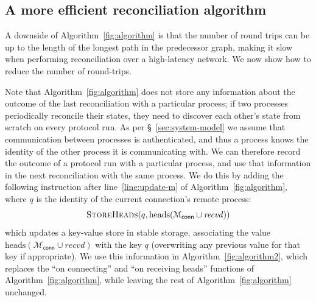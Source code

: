 \documentclass[a4paper,anonymous,USenglish]{lipics-v2019}
\begin{document}
\subsection{A more efficient reconciliation algorithm}\label{sec:algorithm2}

A downside of Algorithm~\ref{fig:algorithm} is that the number of round trips can be up to the length of the longest path in the predecessor graph, making it slow when performing reconciliation over a high-latency network.
We now show how to reduce the number of round-trips.

Note that Algorithm~\ref{fig:algorithm} does not store any information about the outcome of the last reconciliation with a particular process; if two processes periodically reconcile their states, they need to discover each other's state from scratch on every protocol run.
As per \S~\ref{sec:system-model} we assume that communication between processes is authenticated, and thus a process knows the identity of the other process it is communicating with.
We can therefore record the outcome of a protocol run with a particular process, and use that information in the next reconciliation with the same process.
We do this by adding the following instruction after line~\ref{line:update-m} of Algorithm~\ref{fig:algorithm}, where $q$ is the identity of the current connection's remote process:
\[ \textsc{StoreHeads}(q, \mathrm{heads}(\mathcal{M}_\mathsf{conn} \cup \mathit{recvd})) \]
which updates a key-value store in stable storage, associating the value $\mathrm{heads}(\mathcal{M}_\mathsf{conn} \cup \mathit{recvd})$ with the key $q$ (overwriting any previous value for that key if appropriate).
We use this information in Algorithm~\ref{fig:algorithm2}, which replaces the ``on connecting'' and ``on receiving heads'' functions of Algorithm~\ref{fig:algorithm}, while leaving the rest of Algorithm~\ref{fig:algorithm} unchanged.

\end{document}

